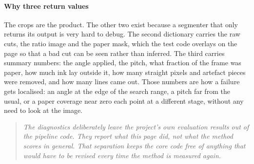 \paragraph{Why three return values}
The crops are the product. The other two exist because a segmenter that only returns its output is very hard to debug. The second dictionary carries the raw cuts, the ratio image and the paper mask, which the test code overlays on the page so that a bad cut can be seen rather than inferred. The third carries summary numbers: the angle applied, the pitch, what fraction of the frame was paper, how much ink lay outside it, how many straight pixels and artefact pieces were removed, and how many lines came out. Those numbers are how a failure gets localised: an angle at the edge of the search range, a pitch far from the usual, or a paper coverage near zero each point at a different stage, without any need to look at the image.


\begin{quote}\small\itshape The diagnostics deliberately leave the project's own evaluation results out of the pipeline code. They report what this page did, not what the method scores in general. That separation keeps the core code free of anything that would have to be revised every time the method is measured again.\end{quote}
